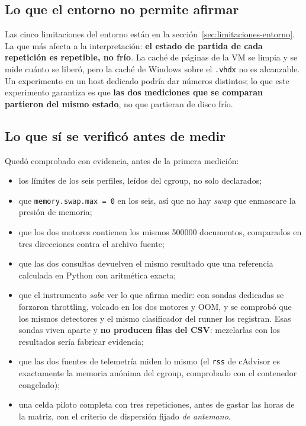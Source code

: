 \subsection{Lo que el entorno no permite afirmar}

Las cinco limitaciones del entorno están en la sección~\ref{sec:limitaciones-entorno}.
La que más afecta a la interpretación: \textbf{el estado de partida de cada
repetición es repetible, no frío}. La caché de páginas de la VM se limpia y se mide
cuánto se liberó, pero la caché de Windows sobre el \texttt{.vhdx} no es
alcanzable. Un experimento en un host dedicado podría dar números distintos; lo que
este experimento garantiza es que \textbf{las dos mediciones que se comparan
partieron del mismo estado}, no que partieran de disco frío.

\subsection{Lo que sí se verificó antes de medir}

Quedó comprobado con evidencia, antes de la primera medición:

\begin{itemize}
  \item los límites de los seis perfiles, leídos del cgroup, no solo declarados;
  \item que \texttt{memory.swap.max = 0} en los seis, así que no hay \emph{swap}
        que enmascare la presión de memoria;
  \item que los dos motores contienen los mismos \num{500000} documentos,
        comparados en tres direcciones contra el archivo fuente;
  \item que las dos consultas devuelven el mismo resultado que una referencia
        calculada en Python con aritmética exacta;
  \item que el instrumento \emph{sabe} ver lo que afirma medir: con sondas
        dedicadas se forzaron throttling, volcado en los dos motores y OOM, y se
        comprobó que los mismos detectores y el mismo clasificador del runner los
        registran. Esas sondas viven aparte y \textbf{no producen filas del CSV}:
        mezclarlas con los resultados sería fabricar evidencia;
  \item que las dos fuentes de telemetría miden lo mismo (el \texttt{rss} de
        cAdvisor es exactamente la memoria anónima del cgroup, comprobado con el
        contenedor congelado);
  \item una celda piloto completa con tres repeticiones, antes de gastar las horas
        de la matriz, con el criterio de dispersión fijado \emph{de antemano}.
\end{itemize}

